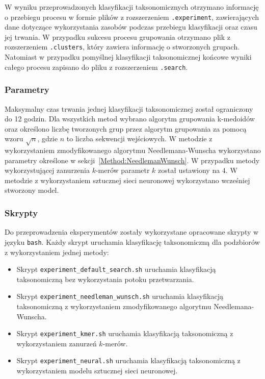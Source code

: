         W wyniku przeprowadzonych klasyfikacji taksonomicznych otrzymano informację o przebiegu procesu w formie plików z rozszerzeniem \texttt{.experiment}, zawierających dane dotyczące wykorzystania zasobów podczas przebiegu klasyfikacji oraz czasu jej trwania. W przypadku sukcesu procesu grupowania otrzymano plik z rozszerzeniem \texttt{.clusters}, który zawiera informację o stworzonych grupach. Natomiast w przypadku pomyślnej klasyfikacji taksonomicznej końcowe wyniki całego procesu zapisano do pliku z rozszerzeniem \texttt{.search}.

        \subsubsection{Parametry}

            Maksymalny czas trwania jednej klasyfikacji taksonomicznej został ograniczony do 12 godzin. Dla wszystkich metod wybrano algorytm grupowania k-medoidów oraz określono liczbę tworzonych grup przez algorytm grupowania za pomocą wzoru $\sqrt{n}$, gdzie $n$ to liczba sekwencji wejściowych. W metodzie z wykorzystaniem zmodyfikowanego algorytmu Needlemana-Wunscha wykorzystano parametry określone w sekcji~\ref{Method:NeedlemanWunsch}. W przypadku metody wykorzystującej zanurzenia $k$-merów parametr $k$ został ustawiony na $4$. W metodzie z wykorzystaniem sztucznej sieci neuronowej wykorzystano wcześniej stworzony model.

        \subsubsection{Skrypty}

            Do przeprowadzenia eksperymentów zostały wykorzystane opracowane skrypty w języku \texttt{bash}. Każdy skrypt uruchamia klasyfikację taksonomiczną dla podzbiorów z wykorzystaniem jednej metody:

            \begin{itemize}
                \item {
                    Skrypt \texttt{experiment\_default\_search.sh} uruchamia klasyfikacją taksonomiczną bez wykorzystania potoku przetwarzania.
                }
                \item {
                    Skrypt \texttt{experiment\_needleman\_wunsch.sh} uruchamia klasyfikacją taksonomiczną z wykorzystaniem zmodyfikowanego algorytmu Needlemana-Wunscha.
                }
                \item {
                    Skrypt \texttt{experiment\_kmer.sh} uruchamia klasyfikacją taksonomiczną z wykorzystaniem zanurzeń $k$-merów.
                }
                \item {
                    Skrypt \texttt{experiment\_neural.sh} uruchamia klasyfikacją taksonomiczną z wykorzystaniem modelu sztucznej sieci neuronowej.
                }
            \end{itemize}

